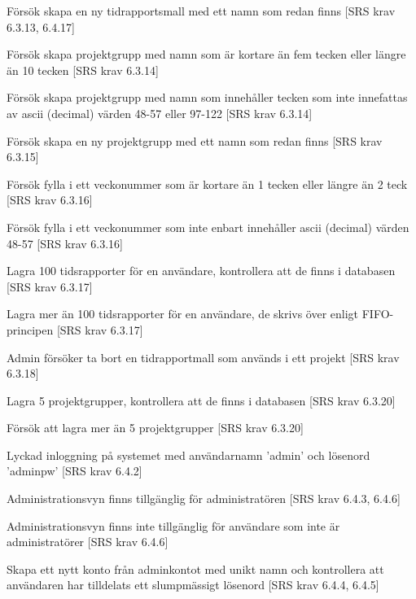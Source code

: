 \documentclass[a4paper]{article}
\begin{document}
\begin{appendices}
\begin{FT}
\item
Försök skapa en ny tidrapportsmall med ett namn som redan finns [SRS krav 6.3.13, 6.4.17]

\item
Försök skapa projektgrupp med namn som är kortare än fem tecken eller längre än 10 tecken [SRS krav 6.3.14]

\item
Försök skapa projektgrupp med namn som innehåller tecken som inte innefattas av ascii (decimal) värden 48-57 eller 97-122 [SRS krav 6.3.14]

\item
Försök skapa en ny projektgrupp med ett namn som redan finns [SRS krav 6.3.15]

\item
Försök fylla i ett veckonummer som är kortare än 1 tecken eller längre än 2 teck [SRS krav 6.3.16]

\item
Försök fylla i ett veckonummer som inte enbart innehåller ascii (decimal) värden 48-57 [SRS krav 6.3.16]

\item
Lagra 100 tidsrapporter för en användare, kontrollera att de finns i databasen [SRS krav 6.3.17]

\item
Lagra mer än 100 tidsrapporter för en användare, de skrivs över enligt FIFO-principen [SRS krav 6.3.17]

\item
Admin försöker ta bort en tidrapportmall som används i ett projekt [SRS krav 6.3.18]

\item
Lagra 5 projektgrupper, kontrollera att de finns i databasen [SRS krav 6.3.20]

\item
Försök att lagra mer än 5 projektgrupper [SRS krav 6.3.20]

\item
Lyckad inloggning på systemet med användarnamn 'admin' och lösenord 'adminpw' [SRS krav 6.4.2]

\item 
Administrationsvyn finns tillgänglig för administratören [SRS krav 6.4.3, 6.4.6]

\item
Administrationsvyn finns inte tillgänglig för användare som inte är administratörer [SRS krav 6.4.6]

\item
Skapa ett nytt konto från adminkontot med unikt namn och kontrollera att användaren har tilldelats ett slumpmässigt lösenord [SRS krav 6.4.4, 6.4.5]


\end{FT}
\end{appendices}
\end{document}
